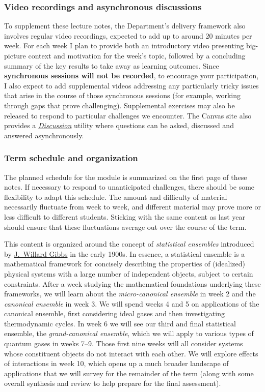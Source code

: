 \subsubsection*{Video recordings and asynchronous discussions}
To supplement these lecture notes, the Department's delivery framework also involves regular video recordings, expected to add up to around 20 minutes per week.
For each week I plan to provide both an introductory video presenting big-picture context and motivation for the week's topic, followed by a concluding summary of the key results to take away as learning outcomes.
Since \textbf{synchronous sessions will not be recorded}, to encourage your participation, I also expect to add supplemental videos addressing any particularly tricky issues that arise in the course of those synchronous sessions (for example, working through gaps that prove challenging).
Supplemental exercises may also be released to respond to particular challenges we encounter.
The Canvas site also provides a \textit{\href{https://liverpool.instructure.com/courses/19478/discussion_topics}{Discussion}} utility where questions can be asked, discussed and answered asynchronously.

\subsubsection*{Term schedule and organization}
The planned schedule for the module is summarized on the first page of these notes.
If necessary to respond to unanticipated challenges, there should be some flexibility to adapt this schedule.
The amount and difficulty of material necessarily fluctuate from week to week, and different material may prove more or less difficult to different students.
Sticking with the same content as last year should ensure that these fluctuations average out over the course of the term.

This content is organized around the concept of \textit{statistical ensembles} introduced by \href{https://en.wikipedia.org/wiki/Josiah_Willard_Gibbs}{J.\ Willard Gibbs} in the early 1900s.
In essence, a statistical ensemble is a mathematical framework for concisely describing the properties of (idealized) physical systems with a large number of independent objects, subject to certain constraints.
After a week studying the mathematical foundations underlying these frameworks, we will learn about the \textit{micro-canonical ensemble} in week 2 and the \textit{canonical ensemble} in week 3.
We will spend weeks 4 and 5 on applications of the canonical ensemble, first considering ideal gases and then investigating thermodynamic cycles.
In week 6 we will see our third and final statistical ensemble, the \textit{grand-canonical ensemble}, which we will apply to various types of quantum gases in weeks 7--9.
Those first nine weeks will all consider systems whose constituent objects do not interact with each other.
We will explore effects of interactions in week 10, which opens up a much broader landscape of applications that we will survey for the remainder of the term (along with some overall synthesis and review to help prepare for the final assessment).

